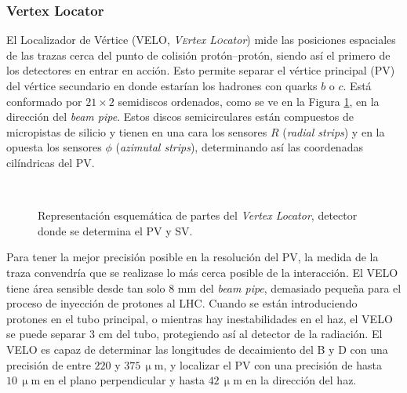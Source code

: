 \subsubsection{Vertex Locator}  %

El Localizador de Vértice (VELO, \emph{\textsc{Ve}rtex \textsc{Lo}cator}) mide las posiciones espaciales de las trazas cerca del punto de colisión protón--protón, siendo así el primero de los detectores en entrar en acción. Esto permite separar el vértice principal (PV) del vértice secundario en donde estarían los hadrones con quarks $b$ o $c$.
Está conformado por $21 \times 2$ semidiscos ordenados, como se ve en la Figura \ref{fig_velo}, en la dirección del \textit{beam pipe}. Estos discos semicirculares están compuestos de micropistas de silicio y tienen en una cara los sensores $R$ (\emph{radial strips}) y en la opuesta los sensores $\phi$ (\emph{azimutal strips}), determinando así las coordenadas cilíndricas del PV. 

\vspace*{-0.5cm}

\begin{figure}[H]
\centering
{} \hfill
{}
 \\ 
 
 \hfill
\caption{Representación esquemática de partes del \emph{Vertex Locator}, detector donde se determina el PV y SV.} \label{fig_velo}
\end{figure}


Para tener la mejor precisión posible en la resolución del PV, la medida de la traza convendría que se realizase lo más cerca posible de la interacción. El VELO tiene área sensible desde tan solo $8$ mm del \emph{beam pipe}, demasiado pequeña para el proceso de inyección de protones al LHC. Cuando se están introduciendo protones en el tubo principal, o mientras hay inestabilidades en el haz, el VELO se puede separar $3$ cm del tubo, protegiendo así al detector de la radiación. El VELO es capaz de determinar las longitudes de decaimiento del B y D con una precisión de entre $220$ y $375 \,\upmu$m, y localizar el PV con una precisión de hasta $10 \, \upmu$m en el plano perpendicular y hasta $42 \,\upmu$m en la dirección del haz.
 
